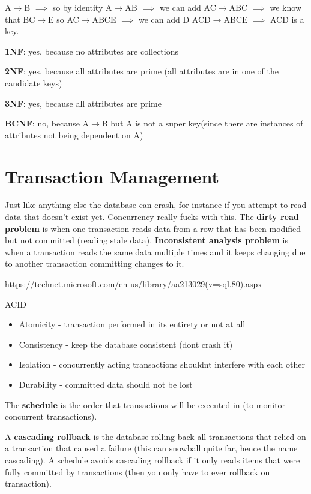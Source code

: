 \documentclass{article}
\begin{document}
A$\rightarrow$B $\implies$ so by identity A$\rightarrow$AB $\implies$ we can add AC$\rightarrow$ABC $\implies$ we know that BC$\rightarrow$E so AC$\rightarrow$ABCE $\implies$ we can add D ACD$\rightarrow$ABCE $\implies$ ACD is a key.

\textbf{1NF}: yes, because no attributes are collections

\textbf{2NF}: yes, because all attributes are prime (all attributes are in one of the candidate keys)

\textbf{3NF}: yes, because all attributes are prime

\textbf{BCNF}: no, because A$\rightarrow$B but A is not a super key(since there are instances of attributes not being dependent on A)

\section*{Transaction Management} %
\label{sec:transaction_management}
Just like anything else the database can crash, for instance if you attempt to read data that doesn't exist yet. Concurrency really fucks with this. The \textbf{dirty read problem} is when one transaction reads data from a row that has been modified but not committed (reading stale data). \textbf{Inconsistent analysis problem} is when a transaction reads the same data multiple times and it keeps changing due to another transaction committing changes to it.

\url{https://technet.microsoft.com/en-us/library/aa213029(v=sql.80).aspx}


ACID
\begin{itemize}
    \item Atomicity - transaction performed in its entirety or not at all
    \item Consistency - keep the database consistent (dont crash it)
    \item Isolation - concurrently acting transactions shouldnt interfere with each other
    \item Durability - committed data should not be lost
\end{itemize}

The \textbf{schedule} is the order that transactions will be executed in (to monitor concurrent transactions).

A \textbf{cascading rollback} is the database rolling back all transactions that relied on a transaction that caused a failure (this can snowball quite far, hence the name cascading). A schedule avoids cascading rollback if it only reads items that were fully committed by transactions (then you only have to ever rollback on transaction).
\end{document}
